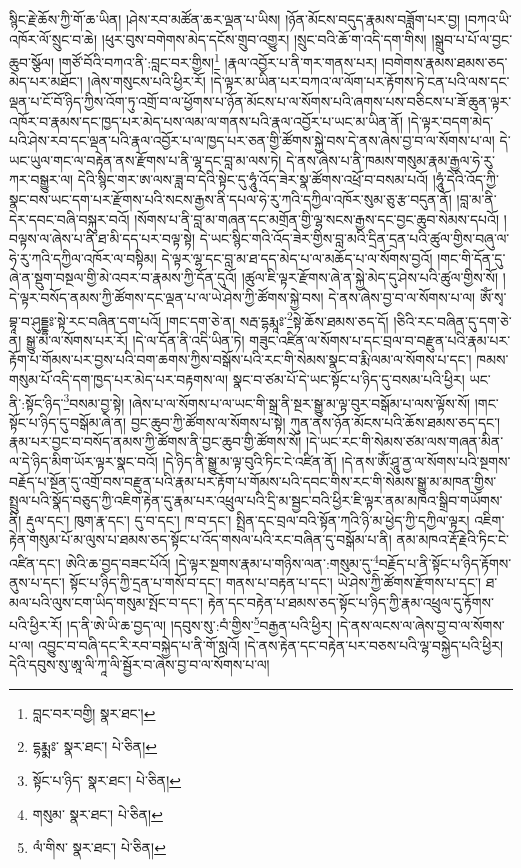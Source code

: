 སྙིང་རྗེ་ཆོས་ཀྱི་གོ་ཆ་ཡིན། །ཤེས་རབ་མཚོན་ཆར་ལྡན་པ་ཡིས། །ཉོན་མོངས་བདུད་རྣམས་བཟློག་པར་བྱ། །བཀའ་ཡི་འཁོར་ལོ་སྲུང་བ་ཆེ། །ཕུར་བུས་བགེགས་མེད་དངོས་གྲུབ་འགྱུར། །སྲུང་བའི་ཆོ་ག་འདི་དག་གིས། །སྒྲུབ་པ་པོ་ལ་བྱང་ཆུབ་སྩོལ། །གཙོ་བོའི་བཀའ་ནི་:བླང་བར་གྱིས།\footnote{བླང་བར་བགྱི།  སྣར་ཐང་། } །རྣལ་འབྱོར་པ་ནི་གར་གནས་པར། །བགེགས་རྣམས་ཐམས་ཅད་མེད་པར་མཐོང་། །ཞེས་གསུངས་པའི་ཕྱིར་རོ། །དེ་ལྟར་མ་ཡིན་པར་བཀའ་ལ་ལོག་པར་རྟོགས་ཏེ་ངན་པའི་ལས་དང་ལྡན་པ་ངོ་བོ་ཉིད་ཀྱིས་འོག་ཏུ་འགྲོ་བ་ལ་ཕྱོགས་པ་ཉོན་མོངས་པ་ལ་སོགས་པའི་ཞགས་པས་བཅིངས་པ་ཟོ་ཆུན་ལྟར་འཁོར་བ་རྣམས་དང་ཁྱད་པར་མེད་པས་ལམ་ལ་གནས་པའི་རྣལ་འབྱོར་པ་ཡང་མ་ཡིན་ནོ། །དེ་ལྟར་བདག་མེད་པའི་ཤེས་རབ་དང་ལྡན་པའི་རྣལ་འབྱོར་པ་ལ་ཁྱད་པར་ཅན་གྱི་ཚོགས་སྐྱེ་བས་དེ་ནས་ཞེས་བྱ་བ་ལ་སོགས་པ་ལ། དེ་ཡང་ཡུལ་གང་ལ་བརྟེན་ནས་རྫོགས་པ་ནི་ལྷ་དང་བླ་མ་ལས་ཏེ། དེ་ནས་ཞེས་པ་ནི་ཁམས་གསུམ་རྣམ་རྒྱལ་ཧེ་རུ་ཀར་བསྒྱུར་ལ། དེའི་སྙིང་གར་ཨ་ལས་ཟླ་བ་དེའི་སྟེང་དུ་ཧཱུཾ་འོད་ཟེར་སྣ་ཚོགས་འཕྲོ་བ་བསམ་པའོ། །ཧཱུཾ་དེའི་འོད་ཀྱི་སྣང་བས་ཡང་དག་པར་རྫོགས་པའི་སངས་རྒྱས་ནི་དཔལ་ཧེ་རུ་ཀའི་དཀྱིལ་འཁོར་སུམ་ཅུ་རྩ་བདུན་ནོ། །བླ་མ་ནི་དེར་དབང་བཞི་བསྐུར་བའོ། །སོགས་པ་ནི་བླ་མ་གཞན་དང་མགྲོན་གྱི་ལྷ་སངས་རྒྱས་དང་བྱང་ཆུབ་སེམས་དཔའོ། །བལྟས་ལ་ཞེས་པ་ནི་ཐ་མི་དད་པར་བལྟ་སྟེ། དེ་ཡང་སྙིང་གའི་འོད་ཟེར་གྱིས་བླ་མའི་དྲིན་དྲན་པའི་ཚུལ་གྱིས་བཞུ་ལ་ཧེ་རུ་ཀའི་དཀྱིལ་འཁོར་ལ་བསྟིམ། དེ་ལྟར་ལྷ་དང་བླ་མ་ཐ་དད་མེད་པ་ལ་མཆོད་པ་ལ་སོགས་བྱའོ། །གང་གི་དོན་དུ་ཞེ་ན་སྡུག་བསྔལ་གྱི་མེ་འབར་བ་རྣམས་ཀྱི་དོན་དུའོ། །ཚུལ་ཇི་ལྟར་རྫོགས་ཞེ་ན་སྐྱེ་མེད་དུ་ཤེས་པའི་ཚུལ་གྱིས་སོ། །དེ་ལྟར་བསོད་ནམས་ཀྱི་ཚོགས་དང་ལྡན་པ་ལ་ཡེ་ཤེས་ཀྱི་ཚོགས་སྐྱེ་བས། དེ་ནས་ཞེས་བྱ་བ་ལ་སོགས་པ་ལ། ཨོཾ་སྭ་བྷཱ་བ་ཤུདྡྷཿ་སྟེ་རང་བཞིན་དག་པའོ། །གང་དག་ཅེ་ན། སརྦ་དྷརྨཱཿ་\footnote{དྷརྨྨཿ་  སྣར་ཐང་།  པེ་ཅིན། }སྟེ་ཆོས་ཐམས་ཅད་དོ། །ཅིའི་རང་བཞིན་དུ་དག་ཅེ་ན། སྒྱུ་མ་ལ་སོགས་པར་རོ། །དེ་ལ་དོན་ནི་འདི་ཡིན་ཏེ། གཟུང་འཛིན་ལ་སོགས་པ་དང་བྲལ་བ་བརྫུན་པའི་རྣམ་པར་རྟོག་པ་གོམས་པར་བྱས་པའི་བག་ཆགས་ཀྱིས་བསྒོས་པའི་རང་གི་སེམས་སྣང་བ་རྨི་ལམ་ལ་སོགས་པ་དང་། ཁམས་གསུམ་པོ་འདི་དག་ཁྱད་པར་མེད་པར་བརྟགས་ལ། སྣང་བ་ཙམ་པོ་དེ་ཡང་སྟོང་པ་ཉིད་དུ་བསམ་པའི་ཕྱིར། ཡང་ནི་:སྟོང་ཉིད་\footnote{སྟོང་པ་ཉིད་  སྣར་ཐང་།  པེ་ཅིན། }བསམ་བྱ་སྟེ། །ཞེས་པ་ལ་སོགས་པ་ལ་ཡང་གི་སྒྲ་ནི་སྔར་སྒྱུ་མ་ལྟ་བུར་བསྒོམ་པ་ལས་ལྟོས་སོ། །གང་སྟོང་པ་ཉིད་དུ་བསྒོམ་ཞེ་ན། བྱང་ཆུབ་ཀྱི་ཚོགས་ལ་སོགས་པ་སྟེ། ཀུན་ནས་ཉོན་མོངས་པའི་ཆོས་ཐམས་ཅད་དང་། རྣམ་པར་བྱང་བ་བསོད་ནམས་ཀྱི་ཚོགས་ནི་བྱང་ཆུབ་གྱི་ཚོགས་སོ། །དེ་ཡང་རང་གི་སེམས་ཙམ་ལས་གཞན་མིན་ལ་དེ་ཉིད་མིག་ཡོར་ལྟར་སྣང་བའོ། །དེ་ཉིད་ནི་སྒྱུ་མ་ལྟ་བུའི་ཏིང་ངེ་འཛིན་ནོ། །དེ་ནས་ཨོཾ་ཤཱུ་ནྱ་ལ་སོགས་པའི་སྔགས་བརྗོད་པ་སྔོན་དུ་འགྲོ་བས་བརྫུན་པའི་རྣམ་པར་རྟོག་པ་གོམས་པའི་དབང་གིས་རང་གི་སེམས་སྒྱུ་མ་མཁན་གྱིས་སྤྲུལ་པའི་སྣོད་བཅུད་ཀྱི་འཇིག་རྟེན་དུ་རྣམ་པར་འཕྲུལ་པའི་དྲི་མ་སྦྱང་བའི་ཕྱིར་ཇི་ལྟར་ནམ་མཁའ་སྒྲིབ་གཡོགས་ནི། རྡུལ་དང་། ཁུག་རྣ་དང་། དུ་བ་དང་། ཁ་བ་དང་། སྤྲིན་དང་བྲལ་བའི་སྟོན་ཀའི་ཉི་མ་ཕྱེད་ཀྱི་དཀྱིལ་ལྟར། འཇིག་རྟེན་གསུམ་པོ་མ་ལུས་པ་ཐམས་ཅད་སྟོང་པ་འོད་གསལ་པའི་རང་བཞིན་དུ་བསྒོམ་པ་ནི། ནམ་མཁའ་རྡོ་རྗེའི་ཏིང་ངེ་འཛིན་དང་། ཨེའི་ཆ་བྱད་བཟང་པོའོ། །དེ་ལྟར་སྔགས་རྣམ་པ་གཉིས་ལན་:གསུམ་དུ་\footnote{གསུམ་  སྣར་ཐང་།  པེ་ཅིན། }བརྗོད་པ་ནི་སྟོང་པ་ཉིད་རྟོགས་ནུས་པ་དང་། སྟོང་པ་ཉིད་ཀྱི་དྲན་པ་གསོ་བ་དང་། གནས་པ་བརྟན་པ་དང་། ཡེ་ཤེས་ཀྱི་ཚོགས་རྫོགས་པ་དང་། ཐ་མལ་པའི་ལུས་ངག་ཡིད་གསུམ་སྤོང་བ་དང་། རྟེན་དང་བརྟེན་པ་ཐམས་ཅད་སྟོང་པ་ཉིད་ཀྱི་རྣམ་འཕྲུལ་དུ་རྟོགས་པའི་ཕྱིར་རོ། །ད་ནི་ཨེ་ཡི་ཆ་བྱད་ལ། །དབུས་སུ་:བཾ་གྱིས་\footnote{ལཾ་གིས་  སྣར་ཐང་།  པེ་ཅིན། }བརྒྱན་པའི་ཕྱིར། །དེ་ནས་ལངས་ལ་ཞེས་བྱ་བ་ལ་སོགས་པ་ལ། འབྱུང་བ་བཞི་དང་རི་རབ་བསྐྱེད་པ་ནི་གོ་སླའོ། །དེ་ནས་རྟེན་དང་བརྟེན་པར་བཅས་པའི་ལྷ་བསྐྱེད་པའི་ཕྱིར། དེའི་དབུས་སུ་ཨཱ་ལི་ཀཱ་ལི་སྦྱོར་བ་ཞེས་བྱ་བ་ལ་སོགས་པ་ལ། 